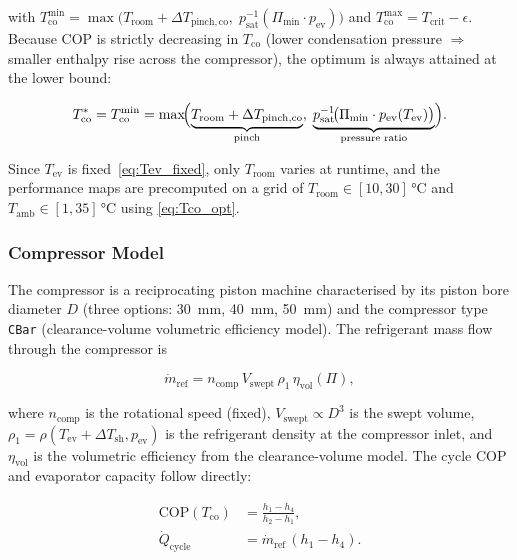 \documentclass[12pt, a4paper]{article}
\newcommand{\mdot}{\dot{m}}
\newcommand{\Qdot}{\dot{Q}}
\newcommand{\Tco}{T_{\mathrm{co}}}
\newcommand{\Tev}{T_{\mathrm{ev}}}
\newcommand{\Tamb}{T_{\mathrm{amb}}}
\newcommand{\Troom}{T_{\mathrm{room}}}
\newcommand{\dTpin}[1]{\Delta T_{\mathrm{pinch,#1}}}
\newcommand{\dTsh}{\Delta T_{\mathrm{sh}}}
\begin{document}
with $\Tco^{\min} = \max\!\bigl(\Troom + \dTpin{co},\;
  p_{\mathrm{sat}}^{-1}(\Pi_{\min} \cdot p_{\mathrm{ev}})\bigr)$
and $\Tco^{\max} = T_{\mathrm{crit}} - \epsilon$.
Because COP is strictly decreasing in $\Tco$ (lower condensation pressure $\Rightarrow$
smaller enthalpy rise across the compressor), the optimum is always attained at the
lower bound:

\begin{equation}
  \Tco^* = \Tco^{\min}
          = \max\!\Bigl(
              \underbrace{\Troom + \dTpin{co}}_{\text{pinch}},\;
              \underbrace{p_{\mathrm{sat}}^{-1}\!\bigl(\Pi_{\min}\cdot p_{\mathrm{ev}}(\Tev)\bigr)}_{\text{pressure ratio}}
            \Bigr).
  \label{eq:Tco_opt}
\end{equation}

Since $\Tev$ is fixed~\eqref{eq:Tev_fixed}, only $\Troom$ varies at runtime, and the
performance maps are precomputed on a grid of
$\Troom \in [10,30]\,\si{\degreeCelsius}$ and
$\Tamb \in [1,35]\,\si{\degreeCelsius}$
using \eqref{eq:Tco_opt}.

\subsubsection{Compressor Model}

The compressor is a reciprocating piston machine characterised by its piston bore
diameter $D$ (three options: \SI{30}{mm}, \SI{40}{mm}, \SI{50}{mm}) and the
compressor type \texttt{CBar} (clearance-volume volumetric efficiency model).
The refrigerant mass flow through the compressor is

\begin{equation}
  \mdot_{\mathrm{ref}}
  = n_{\mathrm{comp}}\,V_{\mathrm{swept}}\,\rho_1\,\eta_{\mathrm{vol}}(\Pi),
  \label{eq:mdot_ref}
\end{equation}

where $n_{\mathrm{comp}}$ is the rotational speed (fixed), $V_{\mathrm{swept}} \propto D^3$
is the swept volume, $\rho_1 = \rho(\Tev + \dTsh, p_{\mathrm{ev}})$ is the
refrigerant density at the compressor inlet, and $\eta_{\mathrm{vol}}$ is the
volumetric efficiency from the clearance-volume model.
The cycle COP and evaporator capacity follow directly:

\begin{align}
  \mathrm{COP}(\Tco)
    &= \frac{h_1 - h_4}{h_2 - h_1},
    \label{eq:cop}\\[4pt]
  \Qdot_{\mathrm{cycle}}
    &= \mdot_{\mathrm{ref}}\,(h_1 - h_4).
    \label{eq:Qcycle}
\end{align}
\end{document}
